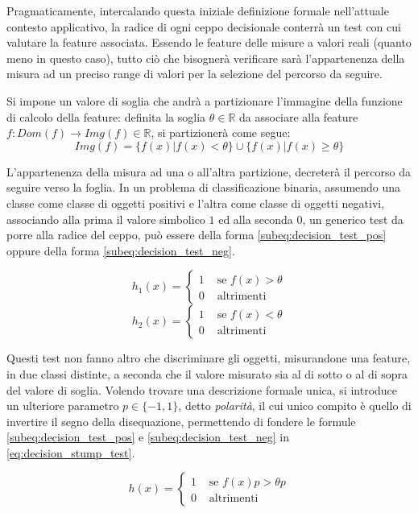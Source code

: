             Pragmaticamente, intercalando questa iniziale definizione formale nell'attuale contesto applicativo, la radice di ogni ceppo decisionale conterrà un test con cui valutare la feature associata.
            Essendo le feature delle misure a valori reali (quanto meno in questo caso), tutto ciò che bisognerà verificare sarà l'appartenenza della misura ad un preciso range di valori per la selezione del percorso da seguire.

            Si impone un valore di soglia che andrà a partizionare l'immagine della funzione di calcolo della feature: definita la soglia $\theta \in \mathbb{R}$ da associare alla feature $f:Dom(f) \rightarrow Img(f) \in \mathbb{R}$, si partizionerà come segue:
            $$Img(f) = \{f(x)|f(x) < \theta\} \cup \{f(x) | f(x) \geq \theta\}$$

            L'appartenenza della misura ad una o all'altra partizione, decreterà il percorso da seguire verso la foglia.
            In un problema di classificazione binaria, assumendo una classe come classe di oggetti positivi e l'altra come classe di oggetti negativi, associando alla prima il valore simbolico $1$ ed alla seconda $0$, un generico test da porre alla radice del ceppo, può essere della forma \ref{subeq:decision_test_pos} oppure della forma \ref{subeq:decision_test_neg}.

            \begin{equation}
                \label{subeq:decision_test_pos}
                h_1(x) =
                \begin{cases}
                    1 & \text{ se } f(x) > \theta \\
                    0 & \text{ altrimenti }
                \end{cases}
            \end{equation}
            \begin{equation}
                \label{subeq:decision_test_neg}
                h_2(x) = 
                \begin{cases}
                    1 & \text{ se } f(x) < \theta \\
                    0 & \text{ altrimenti }
                \end{cases}
            \end{equation}

            Questi test non fanno altro che discriminare gli oggetti, misurandone una feature, in due classi distinte, a seconda che il valore misurato sia al di sotto o al di sopra del valore di soglia.
            Volendo trovare una descrizione formale unica, si introduce un ulteriore parametro $p \in \{-1,1\}$, detto \emph{polarità}, il cui unico compito è quello di invertire il segno della disequazione, permettendo di fondere le formule \ref{subeq:decision_test_pos} e \ref{subeq:decision_test_neg} in \ref{eq:decision_stump_test}.

            \begin{equation}
                \label{eq:decision_stump_test}
                h(x) = 
                \begin{cases}
                    1 & \text{ se } f(x)p > \theta p \\
                    0 & \text{ altrimenti }
                \end{cases}
            \end{equation}

